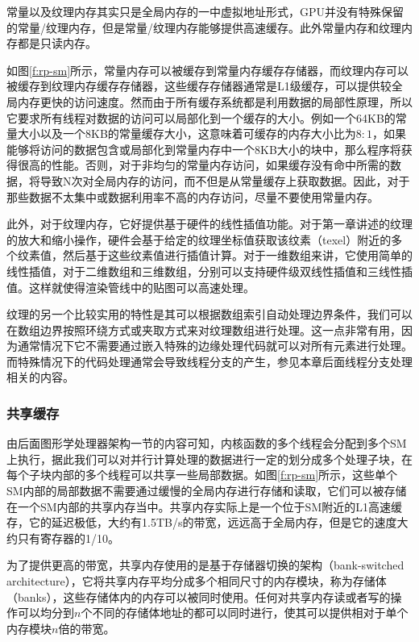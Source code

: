 常量以及纹理内存其实只是全局内存的一中虚拟地址形式，GPU并没有特殊保留的常量/纹理内存，但是常量/纹理内存能够提供高速缓存。此外常量内存和纹理内存都是只读内存。

如图\ref{f:rp-sm}所示，常量内存可以被缓存到常量内存缓存存储器，而纹理内存可以被缓存到纹理内存缓存存储器，这些缓存存储器通常是L1级缓存，可以提供较全局内存更快的访问速度。然而由于所有缓存系统都是利用数据的局部性原理，所以它要求所有线程对数据的访问可以局部化到一个缓存的大小。例如一个64KB的常量大小以及一个8KB的常量缓存大小，这意味着可缓存的内存大小比为$8:1$，如果能够将访问的数据包含或局部化到常量内存中一个8KB大小的块中，那么程序将获得很高的性能。否则，对于非均匀的常量内存访问，如果缓存没有命中所需的数据，将导致N次对全局内存的访问，而不但是从常量缓存上获取数据。因此，对于那些数据不太集中或数据利用率不高的内存访问，尽量不要使用常量内存。

此外，对于纹理内存，它好提供基于硬件的线性插值功能。对于第一章讲述的纹理的放大和缩小操作，硬件会基于给定的纹理坐标值获取该纹素（texel）附近的多个纹素值，然后基于这些纹素值进行插值计算。对于一维数组来讲，它使用简单的线性插值，对于二维数组和三维数组，分别可以支持硬件级双线性插值和三线性插值。这样就使得渲染管线中的贴图可以高速处理。

纹理的另一个比较实用的特性是其可以根据数组索引自动处理边界条件，我们可以在数组边界按照环绕方式或夹取方式来对纹理数组进行处理。这一点非常有用，因为通常情况下它不需要通过嵌入特殊的边缘处理代码就可以对所有元素进行处理。而特殊情况下的代码处理通常会导致线程分支的产生，参见本章后面线程分支处理相关的内容。






\subsubsection{共享缓存}
由后面图形学处理器架构一节的内容可知，内核函数的多个线程会分配到多个SM上执行，据此我们可以对并行计算处理的数据进行一定的划分成多个处理子块，在每个子块内部的多个线程可以共享一些局部数据。如图\ref{f:rp-sm}所示，这些单个SM内部的局部数据不需要通过缓慢的全局内存进行存储和读取，它们可以被存储在一个SM内部的共享内存当中。共享内存实际上是一个位于SM附近的L1高速缓存，它的延迟极低，大约有1.5TB/s的带宽，远远高于全局内存，但是它的速度大约只有寄存器的1/10。

为了提供更高的带宽，共享内存使用的是基于存储器切换的架构（bank-switched architecture），它将共享内存平均分成多个相同尺寸的内存模块，称为存储体（banks），这些存储体内的内存可以被同时使用。任何对共享内存读或者写的操作可以均分到$n$个不同的存储体地址的都可以同时进行，使其可以提供相对于单个内存模块$n$倍的带宽。

